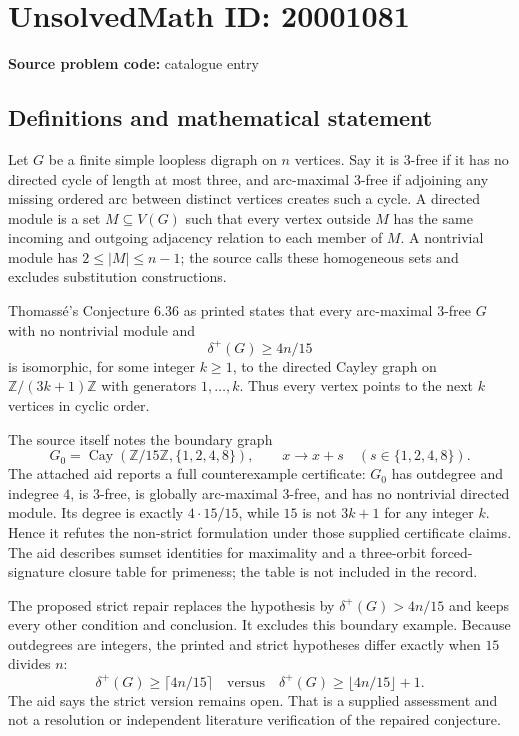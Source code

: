 \documentclass[11pt]{article}
\newcommand{\Z}{\mathbb{Z}}
\begin{document}
\section*{UnsolvedMath ID: 20001081}
\textbf{Source problem code:} catalogue entry
\subsection{Definitions and mathematical statement}
Let $G$ be a finite simple loopless digraph on $n$ vertices. Say it is $3$-free if it has no directed cycle of length at most three, and arc-maximal $3$-free if adjoining any missing ordered arc between distinct vertices creates such a cycle. A directed module is a set $M\subseteq V(G)$ such that every vertex outside $M$ has the same incoming and outgoing adjacency relation to each member of $M$. A nontrivial module has $2\leq|M|\leq n-1$; the source calls these homogeneous sets and excludes substitution constructions.

Thomass\'e's Conjecture 6.36 as printed states that every arc-maximal $3$-free $G$ with no nontrivial module and
\[
 \delta^+(G)\geq4n/15
\]
is isomorphic, for some integer $k\geq1$, to the directed Cayley graph on $\Z/(3k+1)\Z$ with generators $1,\ldots,k$. Thus every vertex points to the next $k$ vertices in cyclic order.

The source itself notes the boundary graph
\[
 G_0=\operatorname{Cay}(\Z/15\Z,\{1,2,4,8\}),\qquad
 x\to x+s\quad(s\in\{1,2,4,8\}).
\]
The attached aid reports a full counterexample certificate: $G_0$ has outdegree and indegree $4$, is $3$-free, is globally arc-maximal $3$-free, and has no nontrivial directed module. Its degree is exactly $4\cdot15/15$, while $15$ is not $3k+1$ for any integer $k$. Hence it refutes the non-strict formulation under those supplied certificate claims. The aid describes sumset identities for maximality and a three-orbit forced-signature closure table for primeness; the table is not included in the record.

The proposed strict repair replaces the hypothesis by $\delta^+(G)>4n/15$ and keeps every other condition and conclusion. It excludes this boundary example. Because outdegrees are integers, the printed and strict hypotheses differ exactly when $15$ divides $n$:
\[
 \delta^+(G)\geq\lceil4n/15\rceil
 \quad\text{versus}\quad
 \delta^+(G)\geq\lfloor4n/15\rfloor+1.
\]
The aid says the strict version remains open. That is a supplied assessment and not a resolution or independent literature verification of the repaired conjecture.
\end{document}

